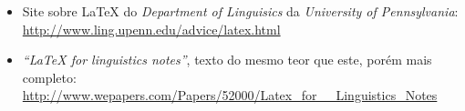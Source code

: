 \begin{itemize}
	\item Site sobre \LaTeX{} do \emph{Department of Linguisics} da \emph{University of Pennsylvania}:\\
	\href{http://www.ling.upenn.e\-du/advice/latex.html}{{\sf http://www.ling.upenn.e\-du/ad\-vi\-ce/latex.html}}

	\item \emph{``\LaTeX{} for linguistics notes''}, texto do mesmo teor que este, porém mais completo:\\
	\href{http://www.wepapers.com/Papers/52000/Latex\_for\_\_Linguistics\_Notes}{{\sf http://www.we\-papers.com/Pa\-pers/52000/La\-tex\_for\_\_Linguistics\_Notes}}
\end{itemize}
